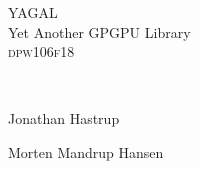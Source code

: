 \documentclass[pdftex,12pt,a4paper]{report}
\begin{document}
\begin{titlepage}
\begin{center}



{ \huge{YAGAL\\Yet Another GPGPU Library} }
\\[1.5cm]

\textsc{dpw106f18}

\begin{figure}[!h]
	\centering
\end{figure}


\textsc{\Large }\\[0.5cm]

\begin{minipage}{0.46\textwidth}
\begin{flushleft} \large
Jonathan Hastrup\\
\end{flushleft}
\end{minipage}
\begin{minipage}{0.45\textwidth}
\begin{flushright} \large
Morten Mandrup Hansen\\
\end{flushright}
\end{minipage}

\vfill

\end{center}
\end{titlepage}
\end{document}

